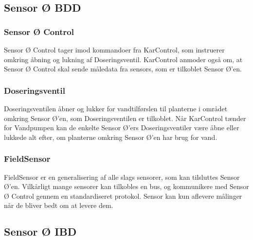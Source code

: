 
\subsection{Sensor Ø BDD}


\subsubsection*{Sensor Ø Control}
Sensor Ø Control tager imod kommandoer fra KarControl, som instruerer omkring åbning og lukning af Doseringsventil. KarControl anmoder også om, at Sensor Ø Control skal sende måledata fra sensors, som er tilkoblet Sensor Ø’en.

\subsubsection{Doseringsventil}
Doseringsventilen åbner og lukker for vandtilførslen til planterne i området omkring Sensor Ø’en, som Doseringsventilen er tilkoblet. Når KarControl tænder for Vandpumpen kan de enkelte Sensor Ø’ers Doseringsventiler være åbne eller lukkede alt efter, om planterne omkring Sensor Ø’en har brug for vand.

\subsubsection{FieldSensor}
FieldSensor er en generalisering af alle slags sensorer, som kan tilsluttes Sensor Ø’en. Vilkårligt mange sensorer kan tilkobles en bus, og kommunikere med Sensor Ø Control gennem en standardiseret protokol. Sensor kan kun aflevere målinger når de bliver bedt om at levere dem.

\subsection{Sensor Ø IBD}


